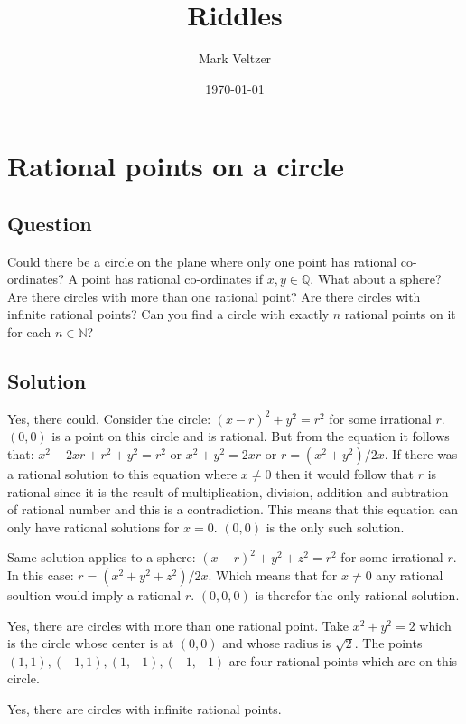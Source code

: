 \documentclass{article}
\title{Riddles}
\author{Mark Veltzer}
\date{\today}
\begin{document}
\maketitle

\section{Rational points on a circle}

\subsection{Question}

Could there be a circle on the plane where only one point has rational co-ordinates? A point has rational co-ordinates if $x,y\in\mathbb{Q}$. What about a sphere? Are there circles with more than one rational point? Are there circles with infinite rational points? Can you find a circle with exactly $n$ rational points on it for each $n\in\mathbb{N}$?

\subsection{Solution}

Yes, there could. Consider the circle: $(x-r)^2+y^2=r^2$ for some irrational $r$.
$(0,0)$ is a point on this circle and is rational. But from the equation it follows
that: $x^2-2xr+r^2+y^2=r^2$ or $x^2+y^2=2xr$ or $r=(x^2+y^2)/2x$. If there
was a rational solution to this equation where $x\ne0$ then it would follow that
$r$ is rational since it is the result of multiplication, division, addition and subtration
of rational number and this is a contradiction. This means that this equation can only
have rational solutions for $x=0$. $(0,0)$ is the only such solution.

Same solution applies to a sphere: $(x-r)^2+y^2+z^2=r^2$ for some irrational $r$.
In this case: $r=(x^2+y^2+z^2)/2x$. Which means that for $x\ne0$ any rational soultion would imply a rational $r$.
$(0,0,0)$ is therefor the only rational solution.

Yes, there are circles with more than one rational point. Take $x^2+y^2=2$ which is the circle whose
center is at $(0,0)$ and whose radius is $\sqrt{2}$. The points $(1,1),(-1,1),(1,-1),(-1,-1)$ are four rational
points which are on this circle.

Yes, there are circles with infinite rational points.

\label{end}
\end{document}
